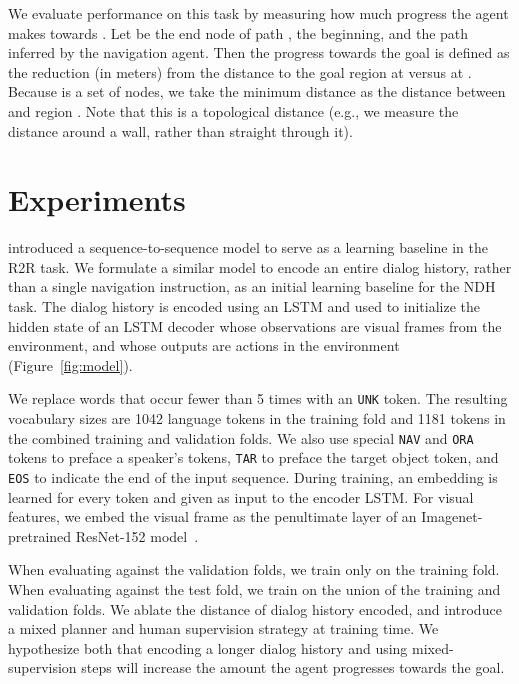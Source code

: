 \documentclass{article}
\newcommand{\task}{NDH}
\begin{document}
We evaluate performance on this task by measuring how much progress the agent makes towards .
Let  be the end node of path ,  the beginning, and  the path inferred by the navigation agent.
Then the progress towards the goal is defined as the reduction (in meters) from the distance to the goal region  at  versus at .
Because  is a set of nodes, we take the minimum distance  as the distance between  and region .
Note that this is a topological distance (e.g., we measure the distance around a wall, rather than straight through it).
 
\section{Experiments}
\label{sec:experiments}

\citet{anderson:cvpr18} introduced a sequence-to-sequence model to serve as a learning baseline in the R2R task.
We formulate a similar model to encode an entire dialog history, rather than a single navigation instruction, as an initial learning baseline for the \task{} task.
The dialog history is encoded using an LSTM and used to initialize the hidden state of an LSTM decoder whose observations are visual frames from the environment, and whose outputs are actions in the environment (Figure~\ref{fig:model}).

We replace words that occur fewer than 5 times with an \texttt{UNK} token.
The resulting vocabulary sizes are 1042 language tokens in the training fold and 1181 tokens in the combined training and validation folds.
We also use special \texttt{NAV} and \texttt{ORA} tokens to preface a speaker's tokens, \texttt{TAR} to preface the target object token, and \texttt{EOS} to indicate the end of the input sequence.
During training, an embedding is learned for every token and given as input to the encoder LSTM.
For visual features, we embed the visual frame as the penultimate layer of an Imagenet-pretrained ResNet-152 model~\cite{he:cvpr16}.

When evaluating against the validation folds, we train only on the training fold.
When evaluating against the test fold, we train on the union of the training and validation folds.
We ablate the distance of dialog history encoded, and introduce a mixed planner and human supervision strategy at training time.
We hypothesize both that encoding a longer dialog history and using mixed-supervision steps will increase the amount the agent progresses towards the goal.
\end{document}
